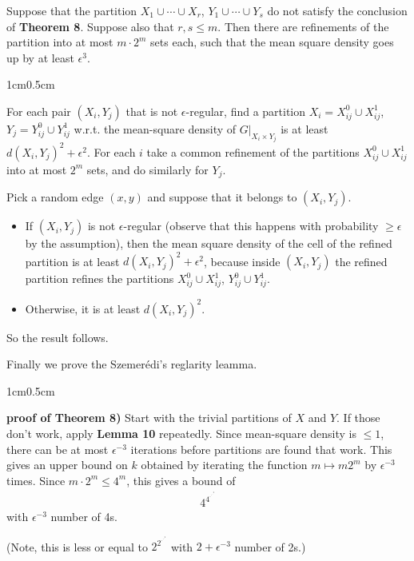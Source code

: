 \documentclass[12pt,a4paper]{report}
\newenvironment{proof}
{\begin{changemargin}{1cm}{0.5cm}
	}%
	{\end{changemargin}
}
\begin{document}
 Suppose that the partition $X_1 \cup \cdots \cup X_r$, $Y_1 \cup \cdots \cup Y_s$ do not satisfy the conclusion of \textbf{Theorem 8}. Suppose also that $r,s\leq m$. Then there are refinements of the partition into at most $m\cdot 2^m$ sets each, such that the mean square density goes up by at least $\epsilon^3$.
\begin{proof}
\pf For each pair $(X_i, Y_j)$ that is not $\epsilon$-regular, find a partition $X_i = X_{ij}^0 \cup X_{ij}^1$, $Y_j = Y_{ij}^0 \cup Y_{ij}^1$ w.r.t. the mean-square density of $G\big|_{X_i \times Y_j}$ is at least $d(X_i, Y_j)^2 + \epsilon^2$. For each $i$ take a common refinement of the partitions $X_{ij}^0 \cup X_{ij}^1$ into at most $2^m$ sets, and do similarly for $Y_j$.

\quad Pick a random edge $(x,y)$ and suppose that it belongs to $(X_i, Y_j)$.
\begin{itemize}
\item If $(X_i, Y_j)$ is not $\epsilon$-regular (observe that this happens with probability $\geq \epsilon$ by the assumption), then the mean square density of the cell of the refined partition is at least $d(X_i, Y_j)^2 + \epsilon^2$, because inside $(X_i, Y_j)$ the refined partition refines the partitions $X_{ij}^0 \cup X_{ij}^1$, $Y_{ij}^0 \cup Y_{ij}^1$.
\item Otherwise, it is at least $d(X_i, Y_j)^2$. 
\end{itemize}
So the result follows.

\eop
\end{proof}
\s

Finally we prove the Szemer\'{e}di's reglarity leamma.
\s

\begin{proof}
\textbf{proof of Theorem 8)} Start with the trivial partitions of $X$ and $Y$. If those don't work, apply \textbf{Lemma 10} repeatedly. Since mean-square density is $\leq 1$, there can be at most $\epsilon^{-3}$ iterations before partitions are found that work. This gives an upper bound on $k$ obtained by iterating the function $m \mapsto m2^m$ by $\epsilon^{-3}$ times. Since $m \cdot 2^m \leq 4^m$, this gives a bound of
\begin{align*}
4^{4^{\cdot^{{\cdot}^{\cdot^{4}}}}}
\end{align*}
with $\epsilon^{-3}$ number of 4s.

\eop

(Note, this is less or equal to $2^{2^{\cdot^{{\cdot}^{\cdot^{2}}}}}$ with $2+\epsilon^{-3}$ number of 2s.)


\end{proof}
\s
\end{document}
